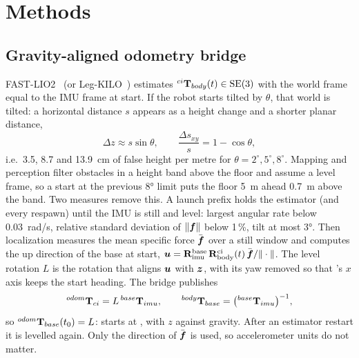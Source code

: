 \section{Methods}
\label{sec:methods}

\subsection{Gravity-aligned odometry bridge}
\label{sec:bridge}

FAST-LIO2~\cite{xu2022fastlio2} (or Leg-KILO~\cite{ou2024legkilo}) estimates
${}^{ci}\mathbf{T}_{body}(t) \in \mathrm{SE}(3)$ with the world frame  equal to the IMU frame at
start. If the robot starts tilted by $\theta$, that world is tilted: a horizontal distance $s$
appears as a height change and a shorter planar distance,
\begin{equation}
  \Delta z \approx s \sin\theta, \qquad \frac{\Delta s_{xy}}{s} = 1 - \cos\theta ,
  \label{eq:tilt}
\end{equation}
i.e.\ 3.5, 8.7 and 13.9~cm of false height per metre for $\theta = 2^\circ, 5^\circ,
8^\circ$. Mapping and perception filter obstacles in a height band above the floor and
assume a level frame, so a start at the previous 8° limit puts the floor 5~m ahead 0.7~m above
the band. Two measures remove this. A launch prefix holds the estimator (and every respawn)
until the IMU is still and level: largest angular rate below 0.03~rad/s, relative standard
deviation of $\|\boldsymbol{f}\|$ below 1\,\%, tilt at most 3°. Then localization measures the mean
specific force $\bar{\boldsymbol{f}}$ over a still window and computes the up direction of the base at
start, $\boldsymbol{u} = \mathbf{R}^{\mathrm{base}}_{\mathrm{imu}}\, \mathbf{R}^{\mathrm{ci}}_{
\mathrm{body}}(t)\, \bar{\boldsymbol{f}} / \|\cdot\|$. The level rotation $L$ is the rotation that
aligns $\boldsymbol{u}$ with $\boldsymbol{z}$, with its yaw removed so that 's $x$ axis keeps the
start heading. The bridge publishes
\begin{equation}
  {}^{odom}\mathbf{T}_{ci} = L\, {}^{base}\mathbf{T}_{imu}, \qquad {}^{body}\mathbf{T}_{base} = \big({}^{base}\mathbf{T}_{imu}\big)^{-1},
\end{equation}
so ${}^{odom}\mathbf{T}_{base}(t_0) = L$:  starts at , with $z$ against gravity.
After an estimator restart it is levelled again. Only the direction of $\bar{\boldsymbol{f}}$ is used,
so accelerometer units do not matter.

